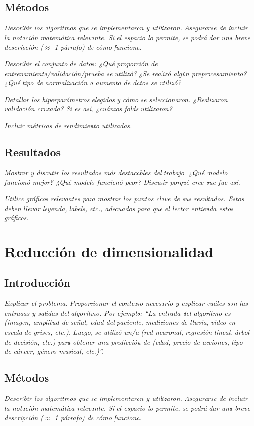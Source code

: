 \documentclass[11pt]{article}
\begin{document}
\subsection{Métodos}
\textit{Describir los algoritmos que se implementaron y utilizaron. Asegurarse de incluir la notación matemática relevante. Si el espacio lo permite, se podrá dar una breve descripción ($\approx$ 1 párrafo) de cómo funciona.}

\textit{Describir el conjunto de datos: ¿Qué proporción de entrenamiento/validación/prueba se utilizó? ¿Se realizó algún preprocesamiento? ¿Qué tipo de normalización o aumento de datos se utilizó?}

\textit{Detallar los hiperparámetros elegidos y cómo se seleccionaron. ¿Realizaron validación cruzada? Si es así, ¿cuántos folds utilizaron?}

\textit{Incluir métricas de rendimiento utilizadas.}

\subsection{Resultados}
\textit{Mostrar y discutir los resultados más destacables del trabajo. ¿Qué modelo funcionó mejor? ¿Qué modelo funcionó peor? Discutir porqué cree que fue así.}

\textit{Utilice gráficos relevantes para mostrar los puntos clave de sus resultados. Estos deben llevar leyenda, labels, etc., adecuados para que el lector entienda estos gráficos.}

\section{Reducción de dimensionalidad}
\subsection{Introducción}
\textit{Explicar el problema. Proporcionar el contexto necesario y explicar cuáles son las entradas y salidas del algoritmo. Por ejemplo: “La entrada del algoritmo es (imagen, amplitud de señal, edad del paciente, mediciones de lluvia, video en escala de grises, etc.). Luego, se utilizó un/a (red neuronal, regresión lineal, árbol de decisión, etc.) para obtener una predicción de (edad, precio de acciones, tipo de cáncer, género musical, etc.)”.}

\subsection{Métodos}
\textit{Describir los algoritmos que se implementaron y utilizaron. Asegurarse de incluir la notación matemática relevante. Si el espacio lo permite, se podrá dar una breve descripción ($\approx$ 1 párrafo) de cómo funciona.}
\end{document}
